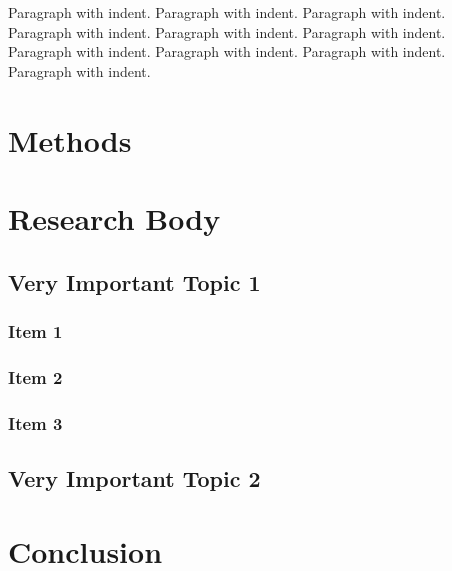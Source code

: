 Paragraph with indent. Paragraph with indent. Paragraph with indent. Paragraph with indent. Paragraph with indent. Paragraph with indent. Paragraph with indent. Paragraph with indent. Paragraph with indent. Paragraph with indent.


\newpage
\section{Methods}
\section{Research Body}
\subsection{Very Important Topic 1}
\subsubsection{Item 1}
\subsubsection{Item 2}
\subsubsection{Item 3}
\newpage
\subsection{Very Important Topic 2}
\newpage
\section{Conclusion}